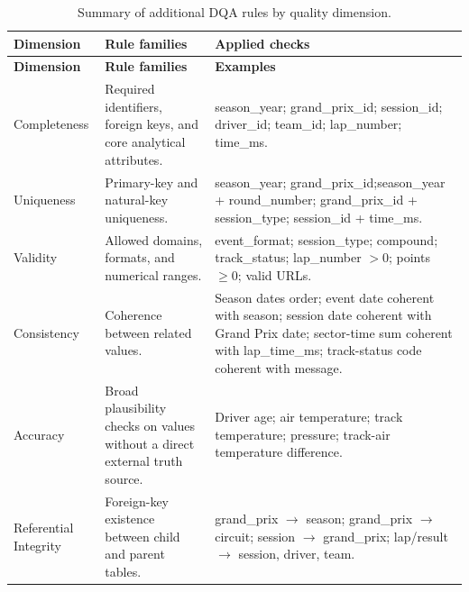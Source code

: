 \documentclass[11pt,a4paper]{article}
\begin{document}
	
	\begin{longtable}{
			>{\raggedright\arraybackslash}p{2cm}
			>{\raggedright\arraybackslash}p{4.6cm}
			>{\raggedright\arraybackslash}p{9cm}
		}
		\caption{Summary of additional DQA rules by quality dimension.}
		\label{tab:appendix-dqa-rules} \\
		\toprule
		\textbf{Dimension}
		& \textbf{Rule families}
		& \textbf{Applied checks} \\
		\midrule
		\endfirsthead
		
		\toprule
		\textbf{Dimension}
		& \textbf{Rule families}
		& \textbf{Examples} \\
		\midrule
		\endhead
		
		\bottomrule
		\endfoot
		
		Completeness
		& Required identifiers, foreign keys, and core analytical attributes.
		& season\_year; grand\_prix\_id; session\_id; driver\_id; team\_id; lap\_number; time\_ms. \\
		
		\midrule
		
		Uniqueness
		& Primary-key and natural-key uniqueness.
		& season\_year; grand\_prix\_id;\newline season\_year + round\_number; \newline grand\_prix\_id + session\_type; \newline session\_id + time\_ms. \\
		
		\midrule
		
		Validity
		& Allowed domains, formats, and numerical ranges.
		& event\_format; session\_type; compound; track\_status; lap\_number $> 0$; points $\geq 0$; valid URLs. \\
		
		\midrule
		
		Consistency
		& Coherence between related values.
		& Season dates order; event date coherent with season; session date coherent with Grand Prix date; sector-time sum coherent with lap\_time\_ms; track-status code coherent with message. \\
		
		\midrule
		
		Accuracy
		& Broad plausibility checks on values without a direct external truth source.
		& Driver age; air temperature; track temperature; pressure; track-air temperature difference. \\
		
		\midrule
		
		Referential Integrity
		& Foreign-key existence between child and parent tables.
		& grand\_prix $\rightarrow$ season; \newline grand\_prix $\rightarrow$ circuit; \newline  session $\rightarrow$ grand\_prix; \newline lap/result $\rightarrow$ session, driver, team. \\
		
	\end{longtable}
	
\end{document}
